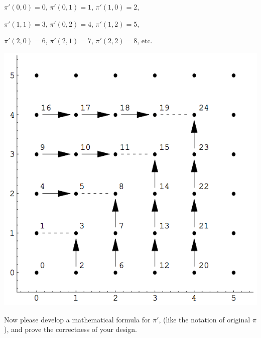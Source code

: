 \documentclass[12pt,a4paper]{article}
\theoremstyle{definition}
\numberwithin{equation}{section}
\numberwithin{figure}{section}
\begin{document}
\begin{enumerate}
\begin{minipage}[t]{0.68\linewidth}
    \vspace{1mm}
  $\pi'(0,0)=0$, $\pi'(0,1)=1$, $\pi'(1,0)=2$,

  $\pi'(1,1)=3$, $\pi'(0,2)=4$, $\pi'(1,2)=5$, 

    $\pi'(2,0)=6$, $\pi'(2,1)=7$, $\pi'(2,2)=8$, etc.
  \end{minipage}
  \hspace{1mm}
  \begin{minipage}[t]{0.32\linewidth}
  \vspace{0pt}
    \includegraphics[width=\columnwidth]{Fig-Pairing.png}
  \end{minipage}

  Now please develop a mathematical formula for $\pi'$, (like the notation of original $\pi$),  and prove the correctness of your design.
 

\end{enumerate}
\end{document}
